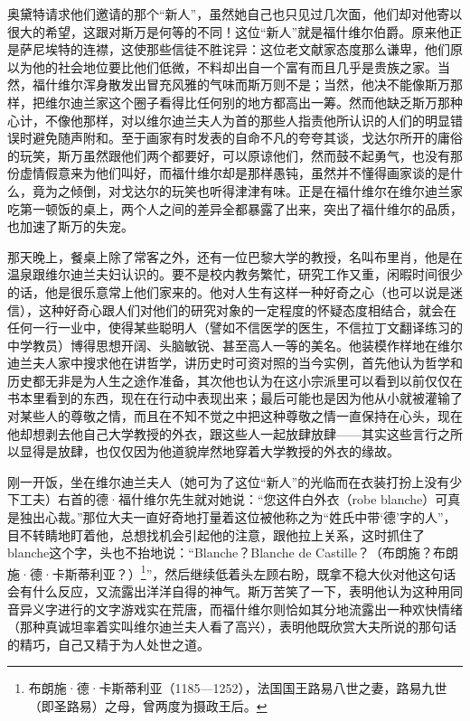\par 奥黛特请求他们邀请的那个“新人”，虽然她自己也只见过几次面，他们却对他寄以很大的希望，这跟对斯万是何等的不同！这位“新人”就是福什维尔伯爵。原来他正是萨尼埃特的连襟，这使那些信徒不胜诧异：这位老文献家态度那么谦卑，他们原以为他的社会地位要比他们低微，不料却出自一个富有而且几乎是贵族之家。当然，福什维尔浑身散发出冒充风雅的气味而斯万则不是；当然，他决不能像斯万那样，把维尔迪兰家这个圈子看得比任何别的地方都高出一筹。然而他缺乏斯万那种心计，不像他那样，对以维尔迪兰夫人为首的那些人指责他所认识的人们的明显错误时避免随声附和。至于画家有时发表的自命不凡的夸夸其谈，戈达尔所开的庸俗的玩笑，斯万虽然跟他们两个都要好，可以原谅他们，然而鼓不起勇气，也没有那份虚情假意来为他们叫好，而福什维尔却是那样愚钝，虽然并不懂得画家谈的是什么，竟为之倾倒，对戈达尔的玩笑也听得津津有味。正是在福什维尔在维尔迪兰家吃第一顿饭的桌上，两个人之间的差异全都暴露了出来，突出了福什维尔的品质，也加速了斯万的失宠。
\par 那天晚上，餐桌上除了常客之外，还有一位巴黎大学的教授，名叫布里肖，他是在温泉跟维尔迪兰夫妇认识的。要不是校内教务繁忙，研究工作又重，闲暇时间很少的话，他是很乐意常上他们家来的。他对人生有这样一种好奇之心（也可以说是迷信），这种好奇心跟人们对他们的研究对象的一定程度的怀疑态度相结合，就会在任何一行一业中，使得某些聪明人（譬如不信医学的医生，不信拉丁文翻译练习的中学教员）博得思想开阔、头脑敏锐、甚至高人一等的美名。他装模作样地在维尔迪兰夫人家中搜求他在讲哲学，讲历史时可资对照的当今实例，首先他认为哲学和历史都无非是为人生之途作准备，其次他也认为在这小宗派里可以看到以前仅仅在书本里看到的东西，现在在行动中表现出来；最后可能也是因为他从小就被灌输了对某些人的尊敬之情，而且在不知不觉之中把这种尊敬之情一直保持在心头，现在他却想剥去他自己大学教授的外衣，跟这些人一起放肆放肆——其实这些言行之所以显得是放肆，也仅仅因为他道貌岸然地穿着大学教授的外衣的缘故。
\par 刚一开饭，坐在维尔迪兰夫人（她可为了这位“新人”的光临而在衣装打扮上没有少下工夫）右首的德·福什维尔先生就对她说：“您这件白外衣（robe blanche）可真是独出心裁。”那位大夫一直好奇地打量着这位被他称之为“姓氏中带‘德’字的人”，目不转睛地盯着他，总想找机会引起他的注意，跟他拉上关系，这时抓住了blanche这个字，头也不抬地说：“Blanche？Blanche de Castille？（布朗施？布朗施·德·卡斯蒂利亚？）\footnote{布朗施·德·卡斯蒂利亚（1185—1252），法国国王路易八世之妻，路易九世（即圣路易）之母，曾两度为摄政王后。}”，然后继续低着头左顾右盼，既拿不稳大伙对他这句话会有什么反应，又流露出洋洋自得的神气。斯万苦笑了一下，表明他认为这种用同音异义字进行的文字游戏实在荒唐，而福什维尔则恰如其分地流露出一种欢快情绪（那种真诚坦率着实叫维尔迪兰夫人看了高兴），表明他既欣赏大夫所说的那句话的精巧，自己又精于为人处世之道。
